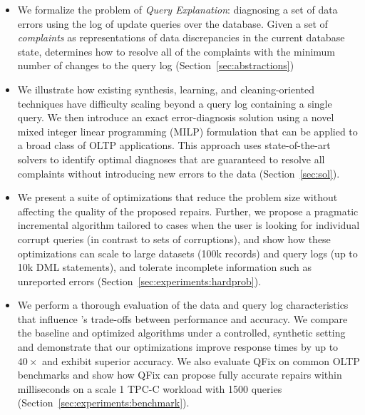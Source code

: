 \begin{itemize}[leftmargin=*, topsep=0mm, itemsep=0mm]

\item We formalize the problem of {\it Query Explanation}: diagnosing a set of data errors using the log of update queries over the database.  Given a set of {\it complaints} as representations of data discrepancies in the current database state, \sys determines how to resolve all of the complaints with the minimum number of changes to the query log (Section~\ref{sec:abstractions})

\item We illustrate how existing synthesis, learning, and cleaning-oriented techniques have difficulty scaling beyond a query log containing a single query.   We then introduce an exact error-diagnosis solution using a novel mixed integer linear programming (MILP) formulation that can be applied to a broad class of OLTP applications.  This approach uses state-of-the-art solvers to identify optimal diagnoses that are guaranteed to resolve all complaints without introducing new errors to the data (Section~\ref{sec:sol}).

\item We present a suite of optimizations that reduce the problem size without affecting the quality of the proposed repairs.  Further, we propose a pragmatic incremental algorithm tailored to cases when the user is looking for individual corrupt queries (in contrast to sets of corruptions), and show how these optimizations can scale to large datasets (100k records) and query logs (up to 10k DML statements), and tolerate incomplete information such as unreported errors (Section~\ref{sec:experiments:hardprob}).

\item We perform a thorough evaluation of the data and query log characteristics that influence \sys's trade-offs between performance and accuracy.  We compare the baseline and optimized algorithms under a controlled, synthetic setting and demonstrate that our optimizations improve response times by up to $40\times$ and exhibit superior accuracy.   We also evaluate QFix on common OLTP benchmarks and show how QFix can propose fully accurate repairs within milliseconds on a scale 1 TPC-C workload with 1500 queries (Section~\ref{sec:experiments:benchmark}).

\end{itemize}
